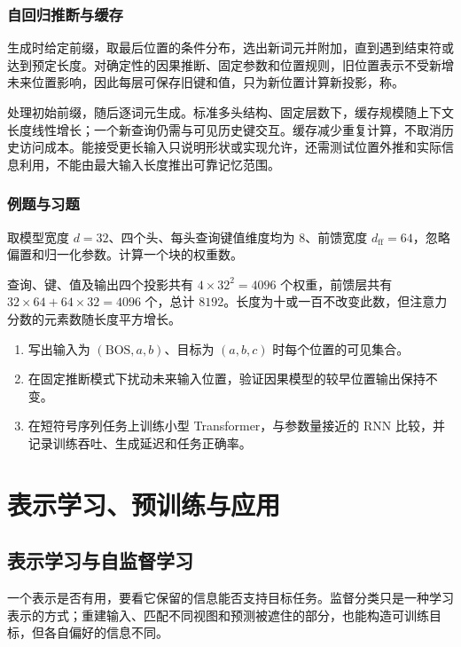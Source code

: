 \documentclass[UTF8,12pt,a4paper,fontset=fandol]{ctexbook}
\begin{document}
\section{自回归推断与缓存}
生成时给定前缀，取最后位置的条件分布，选出新词元并附加，直到遇到结束符或达到预定长度。对确定性的因果推断、固定参数和位置规则，旧位置表示不受新增未来位置影响，因此每层可保存旧键和值，只为新位置计算新投影，称。

处理初始前缀，随后逐词元生成。标准多头结构、固定层数下，缓存规模随上下文长度线性增长；一个新查询仍需与可见历史键交互。缓存减少重复计算，不取消历史访问成本。能接受更长输入只说明形状或实现允许，还需测试位置外推和实际信息利用，不能由最大输入长度推出可靠记忆范围。

\section{例题与习题}
\begin{example}[一个小块的权重数]
取模型宽度 $d=32$、四个头、每头查询键值维度均为 $8$、前馈宽度 $d_{\mathrm{ff}}=64$，忽略偏置和归一化参数。计算一个块的权重数。
\end{example}
\begin{solve}
查询、键、值及输出四个投影共有 $4\times32^2=4096$ 个权重，前馈层共有 $32\times64+64\times32=4096$ 个，总计 $8192$。长度为十或一百不改变此数，但注意力分数的元素数随长度平方增长。
\end{solve}
\begin{enumerate}
\item 写出输入为 $(\mathrm{BOS},a,b)$、目标为 $(a,b,c)$ 时每个位置的可见集合。
\item 在固定推断模式下扰动未来输入位置，验证因果模型的较早位置输出保持不变。
\item 在短符号序列任务上训练小型 Transformer，与参数量接近的 RNN 比较，并记录训练吞吐、生成延迟和任务正确率。
\end{enumerate}

\part{表示学习、预训练与应用}

\chapter{表示学习与自监督学习}
\label{chap:dl-representation}
一个表示是否有用，要看它保留的信息能否支持目标任务。监督分类只是一种学习表示的方式；重建输入、匹配不同视图和预测被遮住的部分，也能构造可训练目标，但各自偏好的信息不同。
\end{document}
